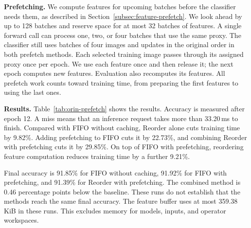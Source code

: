 \begingroup
\color{blue}
\noindent\textbf{Prefetching.}
We compute features for upcoming batches before the classifier needs them, as described in Section~\ref{subsec:feature-prefetch}.
We look ahead by up to 128 batches and reserve space for at most 32 batches of features.
A single forward call can process one, two, or four batches that use the same proxy.
The classifier still uses batches of four images and updates in the original order in both prefetch methods.
Each selected training image passes through its assigned proxy once per epoch.
We use each feature once and then release it; the next epoch computes new features.
Evaluation also recomputes its features.
All prefetch work counts toward training time, from preparing the first features to using the last ones.



\noindent\textbf{Results.}
Table~\ref{tab:orin-prefetch} shows the results. Accuracy is measured after epoch 12. A miss means that an inference request takes more than 33.20\,ms to finish.
Compared with FIFO without caching, Reorder alone cuts training time by 9.82\%.
Adding prefetching to FIFO cuts it by 22.73\%, and combining Reorder with prefetching cuts it by 29.85\%.
On top of FIFO with prefetching, reordering feature computation reduces training time by a further 9.21\%.

Final accuracy is 91.85\% for FIFO without caching, 91.92\% for FIFO with prefetching, and 91.39\% for Reorder with prefetching.
The combined method is 0.46 percentage points below the baseline. These runs do not establish that the methods reach the same final accuracy.
The feature buffer uses at most 359.38\,KiB in these runs. This excludes memory for models, inputs, and operator workspaces.


\par
\endgroup

